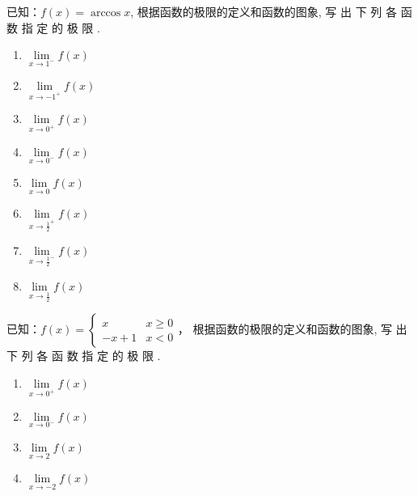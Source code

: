\begin{enumerate}
\noindent
\begin{minipage}{.45\textwidth}
\item 已知：$f(x)=\arccos x$, 根据函数的极限的定义和函数的图象, 写 出 下 列 各 函 数 指 定 的 极 限 . 
\begin{multicols}{2}
\begin{enumerate}[(1)]
    \item $\lim\limits _{x\to 1^- }f( x)$
    \item $\lim\limits _{x\to -1^+ }f( x)$
    \item $\lim\limits _{x\to 0^+ }f( x)$
    \item $\lim\limits _{x\to 0^- }f( x)$
    \item $\lim\limits _{x\to 0 }f( x)$
    \item $\lim\limits _{x\to \tfrac{1}{2}^+ }f( x)$
    \item $\lim\limits _{x\to \tfrac{1}{2}^- }f( x)$
    \item $\lim\limits _{x\to \tfrac{1}{2} }f( x)$
\end{enumerate}
\end{multicols}
\end{minipage}\hfill
\begin{minipage}{.45\textwidth}
\centering
{}    
\end{minipage}

\item 已知：$f(x)=\begin{cases}
    x &x\ge 0\\
-x+1 & x<0
\end{cases}$，
根据函数的极限的定义和函数的图象, 写 出 下 列 各 函 数 指 定 的 极 限 . 
\begin{multicols}{2}
\begin{enumerate}[(1)]
    \item $\lim\limits _{x\to 0^+ }f( x)$
    \item $\lim\limits _{x\to 0^- }f( x)$
    \item $\lim\limits _{x\to 2 }f( x)$
    \item $\lim\limits _{x\to -2 }f( x)$
\end{enumerate}
\end{multicols}
\end{enumerate}

